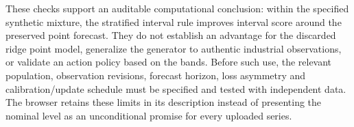 These checks support an auditable computational conclusion: within the
specified synthetic mixture, the stratified interval rule improves interval
score around the preserved point forecast. They do not establish an advantage
for the discarded ridge point model, generalize the generator to authentic
industrial observations, or validate an action policy based on the bands.
Before such use, the relevant population, observation revisions, forecast
horizon, loss asymmetry and calibration/update schedule must be specified and
tested with independent data. The browser retains these limits in its
description instead of presenting the nominal level as an unconditional
promise for every uploaded series.
